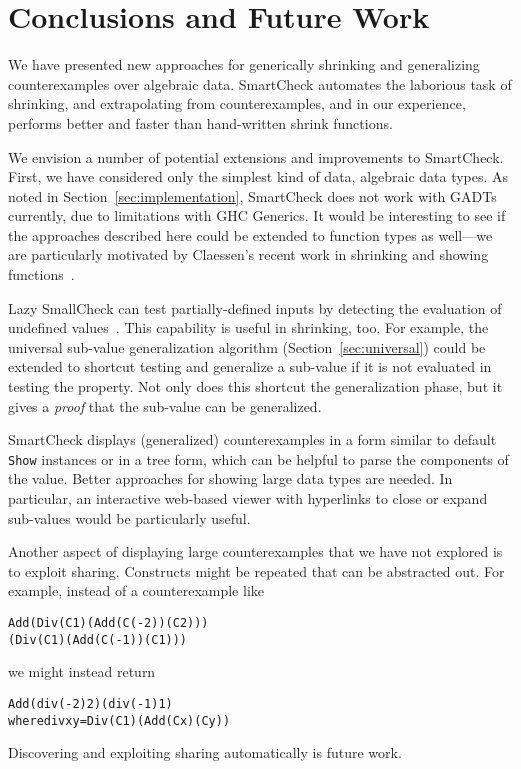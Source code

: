\documentclass{sigplanconf}
\newenvironment{code}{\begin{alltt}\footnotesize}{\end{alltt}}
\newcommand{\ttp}[1]{\texttt{#1}}
\begin{document}
\section{Conclusions and Future Work}\label{sec:conclusions}

We have presented new approaches for generically shrinking and generalizing
counterexamples over algebraic data.  SmartCheck automates the laborious
task of shrinking, and extrapolating from counterexamples, and in our
experience, performs better and faster than hand-written shrink functions.

We envision a number of potential extensions and improvements to SmartCheck.
First, we have considered only the simplest kind of data, algebraic data types.
As noted in Section~\ref{sec:implementation}, SmartCheck does not work with
GADTs currently, due to limitations with GHC Generics.  It would be interesting
to see if the approaches described here could be extended to function types as
well---we are particularly motivated by Claessen's recent work in shrinking and
showing functions~\cite{claessen}.

Lazy SmallCheck can test partially-defined inputs by detecting the evaluation of
undefined values~\cite{sc}.  This capability is useful in shrinking, too.  For
example, the universal sub-value generalization algorithm
(Section~\ref{sec:universal}) could be extended to shortcut testing and
generalize a sub-value if it is not evaluated in testing the property.  Not only
does this shortcut the generalization phase, but it gives a \emph{proof} that the
sub-value can be generalized.

SmartCheck displays (generalized) counterexamples in a form similar to default
\ttp{Show} instances or in a tree form, which can be helpful to parse the
components of the value.  Better approaches for showing large data types are
needed.  In particular, an interactive web-based viewer with hyperlinks to close
or expand sub-values would be particularly useful.

Another aspect of displaying large counterexamples that we have not explored is
to exploit sharing.  Constructs might be repeated that can be abstracted out.
For example, instead of a counterexample like
%
\begin{code}
Add (Div (C 1) (Add (C (-2)) (C 2)))
    (Div (C 1) (Add (C (-1)) (C 1)))
\end{code}
%
\noindent
we might instead return
%
\begin{code}
Add (div (-2) 2) (div (-1) 1)
  where div x y = Div (C 1) (Add (C x) (C y))
\end{code}
%
\noindent
Discovering and exploiting sharing automatically is future work.
\end{document}
